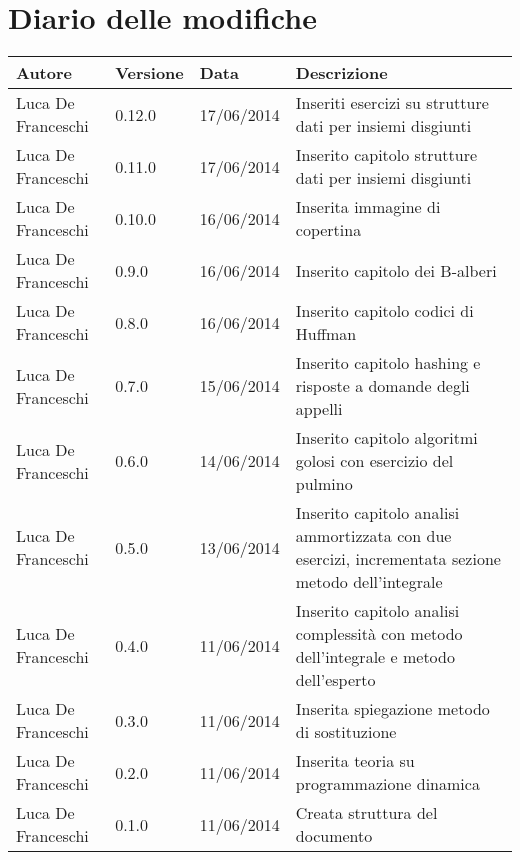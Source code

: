 \section*{Diario delle modifiche}

\begin{center}

	\begin{table}[htpd]
		\begin{tabular}{| l | l | l | p{50mm} |}
			\hline
			\hline
			\textbf{Autore} & \textbf{Versione} & \textbf{Data} & \textbf{Descrizione} \\
			\hline
			\hline 
			Luca De Franceschi & 0.12.0 & 17/06/2014 & Inseriti esercizi su strutture dati per insiemi disgiunti \\ \hline
			Luca De Franceschi & 0.11.0 & 17/06/2014 & Inserito capitolo strutture dati per insiemi disgiunti \\ \hline
			Luca De Franceschi & 0.10.0 & 16/06/2014 & Inserita immagine di copertina \\ \hline
			Luca De Franceschi & 0.9.0 & 16/06/2014 & Inserito capitolo dei B-alberi \\ \hline
			Luca De Franceschi & 0.8.0 & 16/06/2014 & Inserito capitolo codici di Huffman \\ \hline
			Luca De Franceschi & 0.7.0 & 15/06/2014 & Inserito capitolo hashing e risposte a domande degli appelli \\ \hline
			Luca De Franceschi & 0.6.0 & 14/06/2014 & Inserito capitolo algoritmi golosi con esercizio del pulmino \\ \hline
			Luca De Franceschi & 0.5.0 & 13/06/2014 & Inserito capitolo analisi ammortizzata con due esercizi, incrementata sezione metodo dell'integrale \\ \hline
			Luca De Franceschi & 0.4.0 & 11/06/2014 & Inserito capitolo analisi complessità con metodo dell'integrale e metodo dell'esperto \\ \hline
			Luca De Franceschi & 0.3.0 & 11/06/2014 & Inserita spiegazione metodo di sostituzione \\ \hline
			Luca De Franceschi & 0.2.0 & 11/06/2014 & Inserita teoria su programmazione dinamica \\ \hline
			Luca De Franceschi & 0.1.0 & 11/06/2014 & Creata struttura del documento \\ \hline
		\end{tabular}
	\end{table}
	
\end{center}